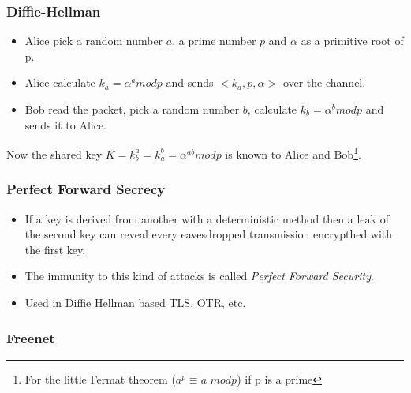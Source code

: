 \begin{frame}[noframenumbering]
	\frametitle{Diffie-Hellman}
	\begin{itemize}
		\item Alice pick a random number $a$, a prime number $p$ and
		$\alpha$ as a primitive root of p.
		\item Alice calculate $k_a = \alpha ^{a} mod p$ and sends $<k_a,
		p, \alpha>$ over the channel.
		\item Bob read the packet, pick a random number $b$,
		calculate $k_b = \alpha^{b} mod p$ and sends it to Alice.
	\end{itemize}
	Now the shared key $K = k_b^{a} = k_a^{b} = \alpha^{ab} mod p$ is known
	to Alice and Bob\footnote{For the little Fermat theorem ($a^p \equiv a$
	$mod p$) if p is a prime}.
\end{frame}

\begin{frame}[noframenumbering]
	\frametitle{Perfect Forward Secrecy}
	\begin{itemize}
		\item If a key is derived from another with a deterministic
		method then a leak of the second key can reveal every
		eavesdropped transmission encrypthed with the first key.
		\item The immunity to this kind of attacks is called
		\textit{Perfect Forward Security}.
		\item Used in Diffie Hellman based TLS, OTR, etc.
	\end{itemize}
\end{frame}

\begin{frame}[noframenumbering]
	\frametitle{Freenet}
\end{frame}

